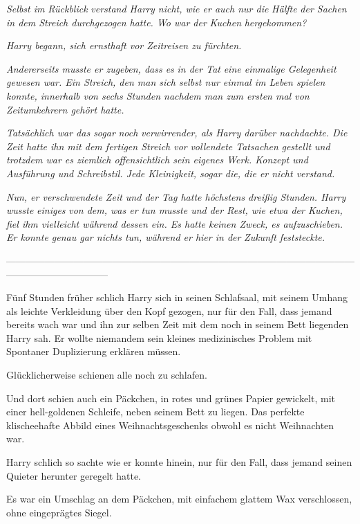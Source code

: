 {\emph{Selbst im} \emph{\emph{Rückblick}} \emph{verstand Harry nicht, wie er auch nur die} \emph{\emph{Hälfte}} \emph{der Sachen in dem Streich durchgezogen hatte. Wo war der} \emph{\emph{Kuchen}} \emph{hergekommen?}

\emph{Harry begann, sich ernsthaft vor Zeitreisen zu fürchten.}

\emph{Andererseits musste er zugeben, dass es} \emph{\emph{in der Tat}} \emph{eine einmalige Gelegenheit gewesen war. Ein Streich, den man sich selbst nur einmal im Leben spielen konnte, innerhalb von sechs Stunden nachdem man zum ersten mal von Zeitumkehrern gehört hatte.}

\emph{Tatsächlich war das sogar} \emph{\emph{noch}} \emph{verwirrender, als Harry darüber nachdachte. Die Zeit hatte ihn mit dem fertigen Streich vor} \emph{\emph{vollendete Tatsachen}} \emph{gestellt und trotzdem war es ziemlich offensichtlich sein eigenes Werk. Konzept und Ausführung und Schreibstil. Jede Kleinigkeit, sogar die, die er nicht verstand.}

\emph{Nun, er verschwendete Zeit und der Tag hatte höchstens dreißig Stunden. Harry wusste} \emph{\emph{einiges}} \emph{von dem, was er tun musste und der Rest, wie etwa der Kuchen, fiel ihm vielleicht während dessen ein. Es hatte keinen Zweck, es aufzuschieben. Er konnte genau gar nichts tun, während er hier in der} \emph{\emph{Zukunft}} \emph{feststeckte.}

--------------------------------------------------------------------------------------------------------------------------------------------

Fünf Stunden früher schlich Harry sich in seinen Schlafsaal, mit seinem Umhang als leichte Verkleidung über den Kopf gezogen, nur für den Fall, dass jemand bereits wach war und ihn zur selben Zeit mit dem noch in seinem Bett liegenden Harry sah. Er wollte niemandem sein kleines medizinisches Problem mit Spontaner Duplizierung erklären müssen.

Glücklicherweise schienen alle noch zu schlafen.

Und dort schien auch ein Päckchen, in rotes und grünes Papier gewickelt, mit einer hell-goldenen Schleife, neben seinem Bett zu liegen. Das perfekte klischeehafte Abbild eines Weihnachtsgeschenks obwohl es nicht Weihnachten war.

Harry schlich so sachte wie er konnte hinein, nur für den Fall, dass jemand seinen Quieter herunter geregelt hatte.

Es war ein Umschlag an dem Päckchen, mit einfachem glattem Wax verschlossen, ohne eingeprägtes Siegel.

}

